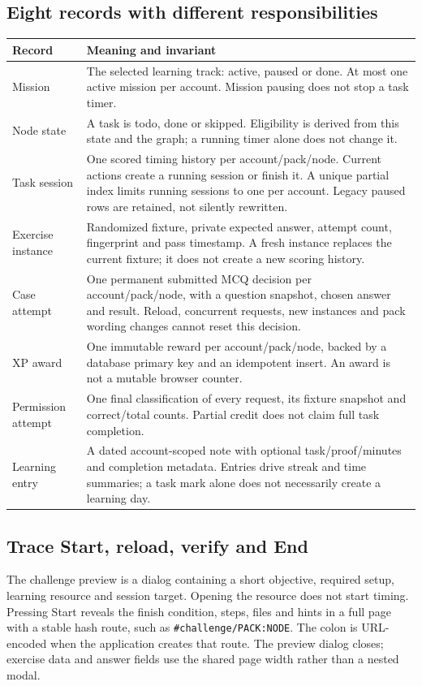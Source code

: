 \subsection{Eight records with different responsibilities}
\begin{longtable}{P{.23\textwidth}P{.69\textwidth}}
\textbf{Record} & \textbf{Meaning and invariant}\\\hline
Mission & The selected learning track: active, paused or done. At most one active
mission per account. Mission pausing does not stop a task timer.\\
Node state & A task is todo, done or skipped. Eligibility is derived from this state
and the graph; a running timer alone does not change it.\\
Task session & One scored timing history per account/pack/node. Current actions
create a running session or finish it. A unique partial index limits running
sessions to one per account. Legacy paused rows are retained, not silently rewritten.\\
Exercise instance & Randomized fixture, private expected answer, attempt count,
fingerprint and pass timestamp. A fresh instance replaces the current fixture;
it does not create a new scoring history.\\
Case attempt & One permanent submitted MCQ decision per account/pack/node, with a
question snapshot, chosen answer and result. Reload, concurrent requests, new
instances and pack wording changes cannot reset this decision.\\
XP award & One immutable reward per account/pack/node, backed by a database primary
key and an idempotent insert. An award is not a mutable browser counter.\\
Permission attempt & One final classification of every request, its fixture snapshot
and correct/total counts. Partial credit does not claim full task completion.\\
Learning entry & A dated account-scoped note with optional task/proof/minutes and
completion metadata. Entries drive streak and time summaries; a task mark alone
does not necessarily create a learning day.\\
\end{longtable}

\subsection{Trace Start, reload, verify and End}
The challenge preview is a dialog containing a short objective, required setup,
learning resource and session target. Opening the resource does not start timing.
Pressing Start reveals the finish condition, steps, files and hints in a full page
with a stable hash
route, such as \texttt{\#challenge/PACK:NODE}. The colon is URL-encoded when the
application creates that route. The preview dialog closes; exercise data and answer
fields use the shared page width rather than a nested modal.


